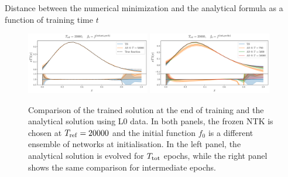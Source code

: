 
Distance between the numerical minimization and the analytical formula as a
function of training time $t$



\newpage


\begin{figure}[ht!]
    \centering
    \includegraphics[width=0.48\textwidth]{plots/analytical_solution/pdf_plot_init_last_epoch_L0.pdf}
    \includegraphics[width=0.48\textwidth]{plots/analytical_solution/pdf_plot_init_epochs_L0.pdf}
    \caption{Comparison of the trained solution at the end of training and
    the analytical solution using L0 data. In both panels, the
    frozen NTK is chosen at $T_{\rm ref} = 20000$ and the initial function $f_0$
    is a different ensemble of networks at initialisation. In the left panel,
    the analytical solution is evolved for $T_{\rm tot}$ epochs, while the right
    panel shows the same comparison for intermediate epochs.}
    \label{fig:xT3_analytical_init_L0}
  \end{figure}

